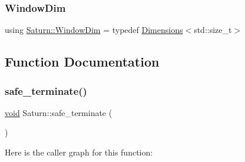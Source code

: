 \mbox{\label{namespace_saturn_a606451fdad804aef3b4f56f6805900f2}} 
\subsubsection{\texorpdfstring{Window\+Dim}{WindowDim}}
{\footnotesize\ttfamily using \mbox{\hyperlink{namespace_saturn_a606451fdad804aef3b4f56f6805900f2}{Saturn\+::\+Window\+Dim}} = typedef \mbox{\hyperlink{struct_saturn_1_1_dimensions}{Dimensions}}$<$std\+::size\+\_\+t$>$}



\subsection{Function Documentation}
\mbox{\label{namespace_saturn_a346560f8ef54f5cb2c0e72fff5057c8f}} 
\subsubsection{\texorpdfstring{safe\+\_\+terminate()}{safe\_terminate()}}
{\footnotesize\ttfamily \mbox{\hyperlink{glad_8h_a950fc91edb4504f62f1c577bf4727c29}{void}} Saturn\+::safe\+\_\+terminate (\begin{DoxyParamCaption}{ }\end{DoxyParamCaption})\hspace{0.3cm}{\ttfamily [inline]}}

Here is the caller graph for this function\+:
